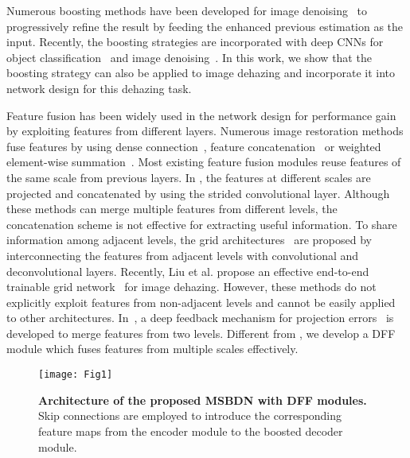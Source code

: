 \documentclass[10pt,twocolumn,letterpaper]{article}
\begin{document}
Numerous boosting methods have been developed for image denoising~\cite{TwicingBoosting, DiffusionBoosting, SOS} to progressively refine the result by feeding the enhanced previous estimation as the input.
Recently, the boosting strategies are incorporated with deep CNNs for object classification~\cite{IBCNN, BoostCNN} and image denoising~\cite{DBF, DBF_PAMI}.
In this work, we show that the boosting strategy can also be applied to image dehazing and incorporate it into network design for this dehazing task.
  
 Feature fusion has been widely used in the network design for performance gain by exploiting features from different layers.
Numerous image restoration methods fuse features by using dense connection~\cite{MsPPN}, feature concatenation~\cite{RDN} or weighted element-wise summation~\cite{GCANet, GFN_BMVC}.
Most existing feature fusion modules reuse features of the same scale from previous layers.
In \cite{MsDense, FSSD}, the features at different scales are projected and concatenated
  by using the strided convolutional layer.
Although these methods can merge multiple features from different levels,
  the concatenation scheme is not effective for extracting useful information.
To share information among adjacent levels,
  the grid architectures~\cite{error_grid, residual_grid} are proposed by interconnecting the features from adjacent levels with convolutional and deconvolutional layers.
Recently, Liu et al. propose an effective end-to-end trainable grid network~\cite{griddehazenet} for image dehazing.
However, these methods do not explicitly exploit features from non-adjacent levels and cannot be easily applied to other architectures.
In~\cite{DBPN}, a deep feedback mechanism for projection errors~\cite{Irani1991,BiBP} is developed to merge features from two levels.
Different from \cite{DBPN}, we develop a DFF module which fuses features from multiple scales effectively.
  
\begin{figure*}
     \centering
     \texttt{[image: Fig1]}\\
     \caption{\textbf{Architecture of the proposed MSBDN with DFF modules.}
Skip connections are employed to introduce the corresponding feature maps from the encoder module to the boosted decoder module.}
   \label{fig:1}
   \vspace{-6mm}
   \end{figure*}
\end{document}
